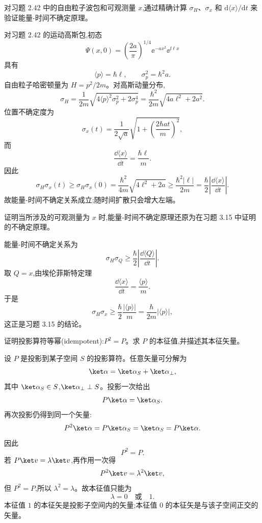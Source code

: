 \begin{question}
对习题 2.42 中的自由粒子波包和可观测量 $x$,通过精确计算 $\sigma_H$、$\sigma_x$ 和 $\mathrm d\langle x\rangle/\mathrm dt$ 来验证能量-时间不确定原理。
\begin{solution}
对习题 2.42 的运动高斯包,初态
\[
\Psi(x,0)=\left(\frac{2a}{\pi}\right)^{1/4}\ee^{-ax^2}\ee^{\ii\ell x}
\]
具有
\[
\langle p\rangle=\hbar\ell,
\qquad
\sigma_p^2=\hbar^2a.
\]
自由粒子哈密顿量为 $H=p^2/2m$。对高斯动量分布,
\[
\sigma_H=\frac1{2m}\sqrt{4\langle p\rangle^2\sigma_p^2+2\sigma_p^4}
=\frac{\hbar^2}{2m}\sqrt{4a\ell^2+2a^2}.
\]
位置不确定度为
\[
\sigma_x(t)=\frac1{2\sqrt a}\sqrt{1+\left(\frac{2\hbar at}{m}\right)^2},
\]
而
\[
\frac{\dd\langle x\rangle}{\dd t}=\frac{\hbar\ell}{m}.
\]
因此
\[
\sigma_H\sigma_x(t)
\ge \sigma_H\sigma_x(0)
=\frac{\hbar^2}{4m}\sqrt{4\ell^2+2a}
\ge \frac{\hbar^2|\ell|}{2m}
=\frac\hbar2\left|\frac{\dd\langle x\rangle}{\dd t}\right|.
\]
故能量-时间不确定关系成立;随时间扩散只会增大左端。
\end{solution}
\end{question}

\begin{question}
证明当所涉及的可观测量为 $x$ 时,能量-时间不确定原理还原为在习题 3.15 中证明的不确定原理。
\begin{solution}
能量-时间不确定关系为
\[
\sigma_H\sigma_Q\ge \frac\hbar2\left|\frac{\dd\langle Q\rangle}{\dd t}\right|.
\]
取 $Q=x$,由埃伦菲斯特定理
\[
\frac{\dd\langle x\rangle}{\dd t}=\frac{\langle p\rangle}{m}.
\]
于是
\[
\sigma_H\sigma_x\ge \frac\hbar2\frac{|\langle p\rangle|}{m}
=\frac{\hbar}{2m}|\langle p\rangle|,
\]
这正是习题 3.15 的结论。
\end{solution}
\end{question}

\begin{question}
证明投影算符等幂(idempotent):$P^2=P$。求 $P$ 的本征值,并描述其本征矢量。
\begin{solution}
设 $P$ 是投影到某子空间 $S$ 的投影算符。任意矢量可分解为
\[
\ket\alpha=\ket\alpha_S+\ket\alpha_\perp,
\]
其中 $\ket\alpha_S\in S$,$\ket\alpha_\perp\perp S$。投影一次给出
\[
P\ket\alpha=\ket\alpha_S.
\]
再次投影仍得到同一个矢量:
\[
P^2\ket\alpha=P\ket\alpha_S=\ket\alpha_S=P\ket\alpha.
\]
因此
\[
\boxed{P^2=P.}
\]
若 $P\ket v=\lambda\ket v$,再作用一次得
\[
P^2\ket v=\lambda^2\ket v,
\]
但 $P^2=P$,所以 $\lambda^2=\lambda$。故本征值只能为
\[
\boxed{\lambda=0\quad\text{或}\quad 1.}
\]
本征值 $1$ 的本征矢是投影子空间内的矢量;本征值 $0$ 的本征矢是与该子空间正交的矢量。
\end{solution}
\end{question}

